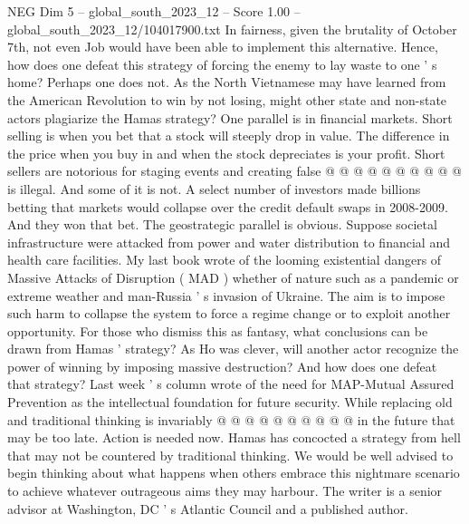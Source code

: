 \begin{textsample}{NEG Dim 5 – global\_south\_2023\_12 – Score 1.00 – global\_south\_2023\_12/104017900.txt}
In fairness, given the brutality of October 7th, not even Job would have been able to implement this alternative.
Hence, how does one defeat this strategy of forcing the enemy to lay waste to one ' s home?
Perhaps one does not.
As the North Vietnamese may have learned from the American Revolution to win by not losing, might other state and non-state actors plagiarize the Hamas strategy?
One parallel is in financial markets.
Short selling is when you bet that a stock will steeply drop in value.
The difference in the price when you buy in and when the stock depreciates is your profit.
Short sellers are notorious for staging events and creating false @ @ @ @ @ @ @ @ @ @ is illegal.
And some of it is not.
A select number of investors made billions betting that markets would collapse over the credit default swaps in 2008-2009.
And they won that bet.
The geostrategic parallel is obvious.
Suppose societal infrastructure were attacked from power and water distribution to financial and health care facilities.
My last book wrote of the looming existential dangers of Massive Attacks of Disruption ( MAD ) whether of nature such as a pandemic or extreme weather and man-Russia ' s invasion of Ukraine.
The aim is to impose such harm to collapse the system to force a regime change or to exploit another opportunity.
For those who dismiss this as fantasy, what conclusions can be drawn from Hamas ' strategy?
As Ho was clever, will another actor recognize the power of winning by imposing massive destruction?
And how does one defeat that strategy?
Last week ' s column wrote of the need for MAP-Mutual Assured Prevention as the intellectual foundation for future security.
While replacing old and traditional thinking is invariably @ @ @ @ @ @ @ @ @ @ in the future that may be too late.
Action is needed now.
Hamas has concocted a strategy from hell that may not be countered by traditional thinking.
We would be well advised to begin thinking about what happens when others embrace this nightmare scenario to achieve whatever outrageous aims they may harbour.
The writer is a senior advisor at Washington, DC ' s Atlantic Council and a published author.

\end{textsample}
